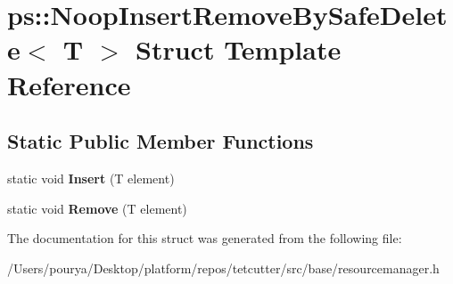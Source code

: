\hypertarget{structps_1_1NoopInsertRemoveBySafeDelete}{}\section{ps\+:\+:Noop\+Insert\+Remove\+By\+Safe\+Delete$<$ T $>$ Struct Template Reference}
\label{structps_1_1NoopInsertRemoveBySafeDelete}
\subsection*{Static Public Member Functions}
\begin{DoxyCompactItemize}
\item 
\hypertarget{structps_1_1NoopInsertRemoveBySafeDelete_a5c4457d7fc123c020b9a0710739296b9}{}static void {\bfseries Insert} (T element)\label{structps_1_1NoopInsertRemoveBySafeDelete_a5c4457d7fc123c020b9a0710739296b9}

\item 
\hypertarget{structps_1_1NoopInsertRemoveBySafeDelete_a78037c5610a765a6c3c2288635c5e988}{}static void {\bfseries Remove} (T element)\label{structps_1_1NoopInsertRemoveBySafeDelete_a78037c5610a765a6c3c2288635c5e988}

\end{DoxyCompactItemize}


The documentation for this struct was generated from the following file\+:\begin{DoxyCompactItemize}
\item 
/\+Users/pourya/\+Desktop/platform/repos/tetcutter/src/base/resourcemanager.\+h\end{DoxyCompactItemize}
